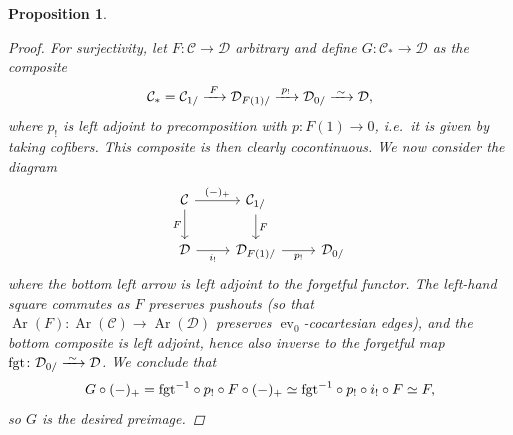 \documentclass[reqno]{memo-l}
\theoremstyle{mythm}
\newtheorem{prop}[thm]{Proposition}
\theoremstyle{definition}
\numberwithin{equation}{section}
\newcommand{\Cc}{{\mathcal{C}}}
\newcommand{\Dd}{{\mathcal{D}}}
\DeclareMathOperator{\ev}{ev}
\DeclareMathOperator{\Ar}{Ar}
\newcommand{\fgt}{\textup{fgt}}
\newcommand{\iso}{\xrightarrow{\;\smash{\raisebox{-0.25ex}{\ensuremath{\scriptstyle\sim}}}\;}}
\begin{document}
\begin{prop}
\begin{proof}
        For surjectivity, let $F\colon\Cc\to\Dd$ arbitrary and define $G\colon\Cc_*\to\Dd$ as the composite
        \[
            \Cc_*=\Cc_{1/}\xrightarrow{\;F\;}\Dd_{F(1)/}\xrightarrow{\;p_!\;}\Dd_{0/}\iso\Dd,
        \]
        where $p_!$ is left adjoint to precomposition with $p\colon F(1)\to 0$, i.e.\ it is given by taking cofibers. This composite is then clearly cocontinuous. We now consider the diagram
        \[
            \begin{tikzcd}
                \Cc\arrow[r,"(-)_+"]\arrow[d,"F"'] & \Cc_{1/}\arrow[d,"F"]\\
                \Dd\arrow[r, "i_!"'] & \Dd_{F(1)/}\arrow[r,"p_!"'] & \Dd_{0/}
            \end{tikzcd}
        \]
        where the bottom left arrow is left adjoint to the forgetful functor. The left-hand square commutes as $F$ preserves pushouts (so that $\Ar(F)\colon\Ar(\Cc)\to\Ar(\Dd)$ preserves $\ev_0$-cocartesian edges), and the bottom composite is left adjoint, hence also inverse to the forgetful map $\fgt\colon\Dd_{0/}\iso\Dd$. We conclude that 
        \[
            G\circ(-)_+=\fgt^{-1}\circ p_!\circ F\circ(-)_+\simeq\fgt^{-1}\circ p_!\circ i_!\circ F\simeq F,
        \]
        so $G$ is the desired preimage.
    \end{proof}
\end{prop}
\end{document}
